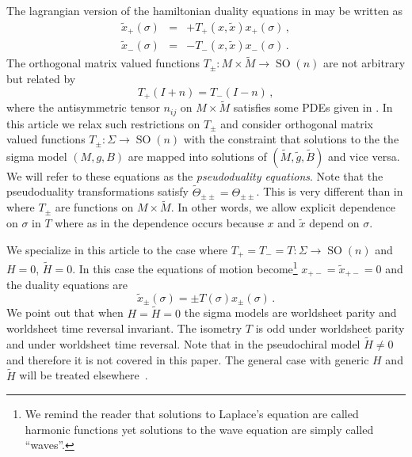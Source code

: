 \documentclass[a4paper,12pt]{article}
\DeclareMathOperator{\SOrth}{SO}
\newcommand{\Btil}{\widetilde{B}}
\newcommand{\Htil}{\widetilde{H}}
\newcommand{\Mtil}{\widetilde{M}}
\newcommand{\gtil}{\tilde{g}}
\newcommand{\xtil}{\tilde{x}}
\begin{document}
The lagrangian version of the hamiltonian duality equations in
\cite{Alvarez:2000bh} may be written as
\begin{eqnarray}
    \xtil_{+}(\sigma) & = & +T_{+}(x,\xtil) x_{+}(\sigma)\,,
    \label{eq:plus}  \\
    \xtil_{-}(\sigma) & = & -T_{-}(x,\xtil) x_{-}(\sigma)\,.
    \label{eq:minus}
\end{eqnarray}
The orthogonal matrix valued functions $T_{\pm}:M \times \Mtil \to
\SOrth(n)$ are not arbitrary but related by
\begin{equation}
    T_{+}(I+n) = T_{-}(I-n)\,,
    \label{eq:Trel}
\end{equation}
where the antisymmetric tensor $n_{ij}$ on $M\times\Mtil$ satisfies
some PDEs given in \cite{Alvarez:2000bh}.  In this article we relax
such restrictions on $T_{\pm}$ and consider orthogonal matrix valued
functions $T_{\pm}:\Sigma \to \SOrth(n)$ with the constraint that
solutions to the the sigma model $(M,g,B)$ are mapped into solutions
of $(\Mtil,\gtil,\Btil)$ and vice versa.  We will refer to these
equations as the \emph{pseudoduality equations}.  Note that the
pseudoduality transformations satisfy $\widetilde{\Theta}_{\pm\pm}
=\Theta_{\pm\pm}$.  This is very different than in
\cite{Alvarez:2000bh} where $T_{\pm}$ are functions on $M\times
\Mtil$.  In other words, we allow explicit dependence on $\sigma$ in
$T$ where as in \cite{Alvarez:2000bh} the dependence occurs because
$x$ and $\xtil$ depend on $\sigma$.

We specialize in this article to the case where $T_{+}=T_{-}=T: \Sigma
\to \SOrth(n)$ and $H=0$, $\Htil=0$.  In this case the equations of
motion become\footnote{We remind the reader that solutions to
Laplace's equation are called harmonic functions yet solutions to the
wave equation are simply called ``waves''.} $x_{+-}=\xtil_{+-}=0$ and
the duality equations are
\begin{equation}
    \xtil_{\pm}(\sigma) = \pm T(\sigma) x_{\pm}(\sigma)\,.
    \label{eq:special}
\end{equation}
We point out that when $H=\Htil=0$ the sigma models are worldsheet
parity and worldsheet time reversal invariant.  The isometry $T$ is
odd under worldsheet parity and under worldsheet time reversal.  Note
that in the pseudochiral model $\Htil \neq 0$ and therefore it is not
covered in this paper.  The general case with generic $H$ and $\Htil$
will be treated elsewhere~\cite{Alvarez:psd2}.
\end{document}
